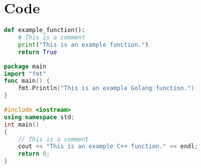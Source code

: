 \newpage
\section{Code}
\begin{lstlisting}[language=Python, caption={Python Code Snippet}]
def example_function():
    # This is a comment
    print("This is an example function.")
    return True
\end{lstlisting}

\begin{lstlisting}[language=Go, caption={Golang Code Snippet}]
package main
import "fmt"
func main() {
    fmt.Println("This is an example Golang function.")
}
\end{lstlisting}

\begin{lstlisting}[language=C++, caption={C++ Code Snippet}]
#include <iostream>
using namespace std;
int main()
{
    // This is a comment
    cout << "This is an example C++ function." << endl;
    return 0;
}
\end{lstlisting}